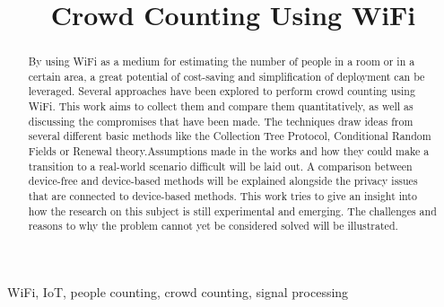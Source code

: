 \documentclass[conference]{IEEEtran}
\begin{document}
\title{Crowd Counting Using WiFi\\
}

\author{

}

\maketitle

\begin{abstract}
By using WiFi as a medium for estimating the number of people in a room or in a certain area, a great potential of cost-saving and simplification of deployment can be leveraged. Several approaches have been explored to perform crowd counting using WiFi. This work aims to collect them and compare them quantitatively, as well as discussing the compromises that have been made. The techniques draw ideas from several different basic methods like the Collection Tree Protocol, Conditional Random Fields or Renewal theory.Assumptions made in the works and how they could make a transition to a real-world scenario difficult will be laid out. A comparison between device-free and device-based methods will be explained alongside the privacy issues that are connected to device-based methods. This work tries to give an insight into how the research on this subject is still experimental and emerging. The challenges and reasons to why the problem cannot yet be considered solved will be illustrated.

\end{abstract}

\begin{IEEEkeywords}
WiFi, IoT, people counting, crowd counting, signal processing
\end{IEEEkeywords}

\end{document}
